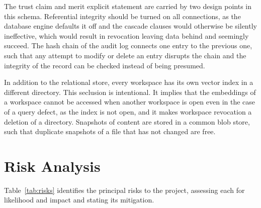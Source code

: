 \documentclass{FastFyp}
\begin{document}
The trust claim and merit explicit statement are carried by two design points in this schema. Referential integrity should be turned on all connections, as the database engine defaults it off and the cascade clauses would otherwise be silently ineffective, which would result in revocation leaving data behind and seemingly succeed. The hash chain of the audit log connects one entry to the previous one, such that any attempt to modify or delete an entry disrupts the chain and the integrity of the record can be checked instead of being presumed.

In addition to the relational store, every workspace has its own vector index in a different directory. This seclusion is intentional. It implies that the embeddings of a workspace cannot be accessed when another workspace is open even in the case of a query defect, as the index is not open, and it makes workspace revocation a deletion of a directory. Snapshots of content are stored in a common blob store, such that duplicate snapshots of a file that has not changed are free.

\section{Risk Analysis}
Table~\ref{tab:risks} identifies the principal risks to the project, assessing each for likelihood and impact and stating its mitigation.
\end{document}
